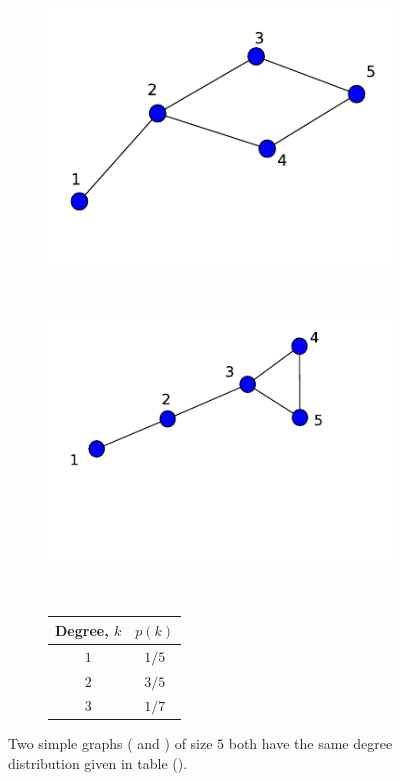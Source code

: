 \documentclass[10pt,a4paper]{article}
\begin{document}
\begin{figure}[H]
	\centering
			\begin{subfigure}[b]{0.35\textwidth}
				\includegraphics[width=\textwidth]{images/sameDegreeDistribution.pdf}
				\caption{}
				\label{samedeg1}
			\end{subfigure}~
			\begin{subfigure}[b]{0.35\textwidth}
				\includegraphics[width=\textwidth]{images/sameDegreeDistribution2.pdf}
				\caption{}
				\label{samedeg2}
			\end{subfigure}~ 
	\begin{subfigure}[b]{.35\textwidth}
		\centering
		\vspace{0pt}
		\setlength{\tabcolsep}{10pt}
		\renewcommand{\arraystretch}{2.0}
		\begin{tabular}{|c|c|}
			\hline 
			Degree, $k$ & $p(k)$ \\
			\hline
			$1$ & $1/5$ \\
			$2$ & $3/5$ \\
			$3$ & $1/7$ \\
			\hline
		\end{tabular}
        \caption{}	
        \label{tabdegdist}
	\end{subfigure}
    \caption{Two simple graphs ( and ) of size $5$ both have the same degree distribution given in table ().}
\end{figure}
\end{document}
